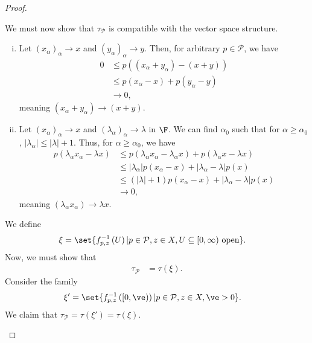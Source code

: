 \documentclass[10pt]{mypackage}
\begin{document}
\begin{proof}
\begin{enumerate}[(1)]
      We must now show that $\tau_{\mathcal{P}}$ is compatible with the vector space structure.
      \begin{enumerate}[(i)]
        \item Let $\left(x_{\alpha}\right)_{\alpha}\rightarrow x$ and $\left(y_{\alpha}\right)_{\alpha}\rightarrow y$. Then, for arbitrary $p\in \mathcal{P}$, we have
          \begin{align*}
            0 &\leq p\left(\left(x_{\alpha} + y_{\alpha}\right) - \left(x+y\right)\right)\\
              &\leq p\left(x_{\alpha} - x\right) + p\left(y_{\alpha} - y\right)\\
              &\rightarrow 0,
          \end{align*}
          meaning $\left(x_{\alpha} + y_{\alpha}\right) \rightarrow \left(x+y\right)$.
        \item Let $\left(x_{\alpha}\right)_{\alpha}\rightarrow x$ and $\left(\lambda_\alpha\right)_{\alpha}\rightarrow \lambda$ in $\F$. We can find $\alpha_0$ such that for $\alpha \geq \alpha_0$, $\left\vert \lambda_{\alpha} \right\vert \leq \left\vert \lambda \right\vert + 1$. Thus, for $\alpha \geq \alpha_0$, we have
          \begin{align*}
            p\left(\lambda_{\alpha}x_{\alpha} - \lambda x\right) &\leq p\left(\lambda_{\alpha}x_{\alpha} - \lambda_{\alpha} x\right) + p\left(\lambda_{\alpha} x - \lambda x\right)\\
                                                                 &\leq \left\vert \lambda_{\alpha} \right\vert p\left(x_{\alpha} - x\right) + \left\vert \lambda_{\alpha} - \lambda \right\vert p\left(x\right)\\
                                                                 &\leq \left(\left\vert \lambda \right\vert + 1\right)p\left(x_{\alpha} - x\right) + \left\vert \lambda_{\alpha} - \lambda \right\vert p\left(x\right)\\
                                                                 &\rightarrow 0,
          \end{align*}
          meaning $\left(\lambda_{\alpha}x_{\alpha}\right)\rightarrow \lambda x$.
      \end{enumerate}
      We define
      \begin{align*}
        \xi &= \set{f_{p,z}^{-1}\left(U\right)| p\in \mathcal{P},z\in X,U\subseteq [0,\infty)\text{ open}}.
      \end{align*}
      Now, we must show that 
      \begin{align*}
        \tau_{\mathcal{P}} &= \tau\left(\xi\right).
      \end{align*}
      Consider the family
      \begin{align*}
        \xi' &= \set{f_{p,z}^{-1}\left([0,\ve)\right)| p\in \mathcal{P},z\in X,\ve > 0}.
      \end{align*}
      We claim that $\tau_{\mathcal{P}} = \tau\left(\xi'\right) = \tau\left(\xi\right)$.\newline


\end{enumerate}
\end{proof}
\end{document}
